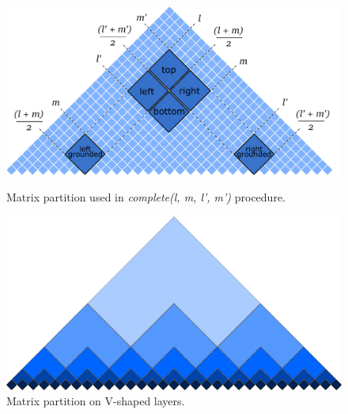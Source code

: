 \begin{figure}
    \centering
    \captionsetup{justification=centering}
    \begin{minipage}{0.40\textwidth}
        \centering
        \includegraphics[width=1\textwidth]{pictures/splitting_with_grounded.pdf}
        \caption{Matrix partition used in \textit{complete(l, m, l', m')} procedure.}
        \label{fig2}
    \end{minipage}\hfill
    \begin{minipage}{0.40\textwidth}
        \centering
        \includegraphics[width=1\textwidth]{pictures/layers.pdf}
        \caption{Matrix partition on V-shaped layers.}
        \label{fig3}
    \end{minipage}
\end{figure}
